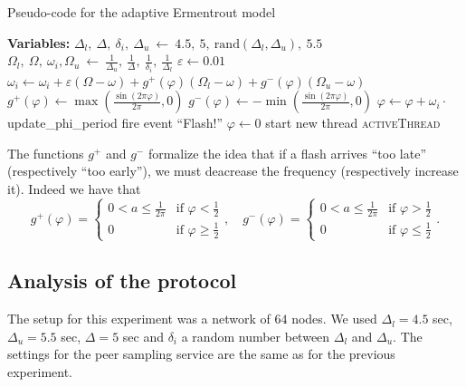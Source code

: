 \documentclass[a4paper, 11pt]{article}
\renewcommand{\epsilon}{\varepsilon}
\renewcommand{\phi}{\varphi}
\theoremstyle{plain}
\theoremstyle{definition}
\begin{document}
    \begin{algorithm}
     \caption{Pseudo-code for the adaptive Ermentrout model}
     \label{alg:adapt-er}
     \begin{algorithmic}
       \State \textbf{Variables:}
       \State $\Delta_l,\ \Delta,\ \delta_i,\ \Delta_u\ \gets\ 4.5,\ 5,\ \mathrm{rand}(\Delta_l, \Delta_u),\
       5.5$ 
       \State $\Omega_l,\ \Omega,\ \omega_i, \Omega_u\ \gets\ \frac{1}{\Delta_u},\ \frac{1}{\Delta},\
       \frac{1}{\delta_i},\ \frac{1}{\Delta_l}$
       \State $\epsilon \gets 0.01$
       \State
         \State $\omega_i \gets \omega_i + \epsilon(\Omega - \omega) + g^+(\phi)(\Omega_l - \omega) +
         g^-(\phi)(\Omega_u - \omega)$
       \EndFunction
       \State
       \State $g^+(\phi) \gets \max \left( \frac{\sin(2\pi \phi)}{2\pi}, 0 \right)$
       \State $g^-(\phi) \gets -\min \left( \frac{\sin(2\pi \phi)}{2\pi}, 0 \right)$
       \State
       \Function{updatePhi()}{}
         \If{$\phi < 1$}
           \State $\phi \gets \phi + \omega_i \cdot $update\_phi\_period
         \Else
           \State fire event ``Flash!''
           \State $\phi \gets 0$
           \State start new thread \textsc{activeThread}
         \EndIf
       \EndFunction
     \end{algorithmic}
   \end{algorithm}


   The functions $g^+$ and $g^-$ formalize the idea that if a flash arrives ``too late'' (respectively ``too
   early''), we must deacrease the frequency (respectively increase it). Indeed we have that
   \[
   g^+(\phi) = 
   \begin{cases}
     0 < a \leq \frac{1}{2\pi} & \text{if } \phi < \frac{1}{2}\\
     0 & \text{if } \phi \geq \frac{1}{2}
   \end{cases},\quad
   g^-(\phi) = 
   \begin{cases}
     0 < a \leq \frac{1}{2\pi} & \text{if } \phi > \frac{1}{2}\\
     0 & \text{if } \phi \leq \frac{1}{2}
   \end{cases}.
   \]

   
    
   \subsection{Analysis of the protocol}
   \label{sec:analysis-protocol-er}

     The setup for this experiment was a network of $64$ nodes. We used $\Delta_l = 4.5$ sec, $\Delta_u = 5.5$
     sec, $\Delta = 5$ sec and $\delta_i$ a random number between $\Delta_l$ and $\Delta_u$. The settings for
     the peer sampling service are the same as for the previous experiment.
     
\end{document}
